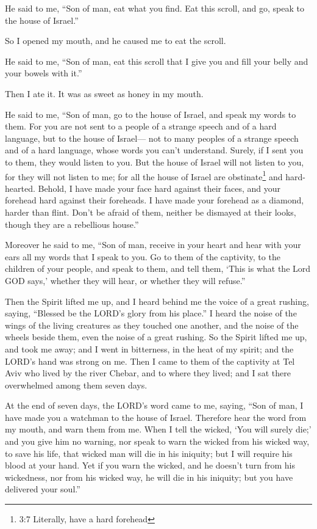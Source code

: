 \mychapter{} \myverse*{}He said to me, “Son of man, eat what you find. Eat this scroll,
and go, speak to the house of Israel.”

\myverse{}So I opened my mouth, and he caused me to eat the scroll.

\myverse{}He said to me, “Son of man, eat this scroll that I give you and
fill your belly and your bowels with it.”

Then I ate it. It was as sweet as honey in my mouth.

\myverse{}He said to me, “Son of man, go to the house of Israel, and speak
my words to them.
\myverse{}For you are not sent to a people of a strange speech and of a hard language,
but to the house of Israel—
\myverse{}not to many peoples of a strange speech and of a hard language, whose words
you can’t understand. Surely, if I sent you to them, they would listen to you.
\myverse{}But the house of Israel will not listen to you, for they will not listen to
me; for all the house of Israel are obstinate\footnote{3:7 Literally, have a hard forehead} and hard-hearted.
\myverse{}Behold, I have made your face hard against their faces, and your forehead hard
against their foreheads.
\myverse{}I have made your forehead as a diamond, harder than flint. Don’t be afraid of
them, neither be dismayed at their looks, though they are a rebellious house.”

\myverse{}Moreover he said to me, “Son of man, receive in your heart and
hear with your ears all my words that I speak to you.
\myverse{}Go to them of the captivity, to the children of your people, and speak to
them, and tell them, ‘This is what the Lord GOD says,’ whether they will hear, or whether they will refuse.”

\myverse{}Then the Spirit lifted me up, and I heard behind me the voice
of a great rushing, saying, “Blessed be the LORD’s glory from his place.”
\myverse{}I heard the noise of the wings of the living creatures as they touched one
another, and the noise of the wheels beside them, even the noise of a great rushing.
\myverse{}So the Spirit lifted me up, and took me away; and I went in bitterness, in
the heat of my spirit; and the LORD’s hand was strong on me.
\myverse{}Then I came to them of the captivity at Tel Aviv who lived by the river Chebar,
and to where they lived; and I sat there overwhelmed among them seven days.

\myverse{}At the end of seven days, the LORD’s word came to me, saying,
\myverse{}“Son of man, I have made you a watchman to the house of Israel. Therefore
hear the word from my mouth, and warn them from me.
\myverse{}When I tell the wicked, ‘You will surely die;’ and you give him no warning,
nor speak to warn the wicked from his wicked way, to save his life, that wicked man will die in his iniquity;
but I will require his blood at your hand.
\myverse{}Yet if you warn the wicked, and he doesn’t turn from his wickedness, nor from
his wicked way, he will die in his iniquity; but you have delivered your soul.”

